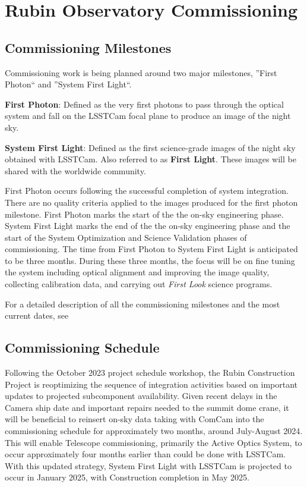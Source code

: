 \section{Rubin Observatory Commissioning}
\label{sec:commissioning}

\subsection{Commissioning Milestones}
\label{ssec:commissioning-milestones}

Commissioning work is being planned around two major milestones, ''First Photon`` and ''System First Light``. 

\textbf {First Photon}: Defined as the very first photons to pass through the optical system and fall on the LSSTCam focal plane to produce an image of the night sky.

\textbf {System First Light}: Defined as the first science-grade images of the night sky obtained with LSSTCam. 
Also referred to as \textbf{First Light}. 
These images will be shared with the worldwide community. 

First Photon occurs following the successful completion of system integration. 
There are no quality criteria applied to the images produced for the first photon milestone. 
First Photon  marks the start of the the on-sky engineering phase.
System First Light  marks the end of the the on-sky engineering phase and the start of the System Optimization and Science Validation phases of commissioning.
The time from First Photon to System First Light is anticipated to be three months.
During these three months, the focus will be on fine tuning the system including optical alignment and improving the image quality, collecting calibration data, and carrying out \textit{First Look} science programs. 

For a detailed description of all the commissioning milestones and the most current dates, see 

\subsection{Commissioning Schedule}
\label{ssec:commissioning-schedule}

Following the October 2023 project schedule workshop, the Rubin Construction Project is reoptimizing the sequence of integration activities based on important updates to projected subcomponent availability.
Given recent delays in the Camera ship date and important repairs needed to the summit dome crane, it will be beneficial to reinsert on-sky data taking with ComCam into the commissioning schedule for approximately two months, around July-August 2024. 
This will enable Telescope commissioning, primarily the Active Optics System, to occur approximately four months earlier than could be done with LSSTCam. 
With this updated strategy, System First Light with LSSTCam is projected to occur in January 2025, with Construction completion in May 2025.

